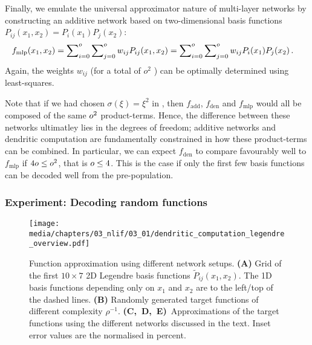 Finally, we emulate the universal approximator nature of multi-layer networks by constructing an additive network based on two-dimensional basis functions $P_{ij}(x_1, x_2) = P_{i}(x_1) P_j(x_2)$:
\begin{align}
	f_\mathrm{mlp}(x_1, x_2)
		&= \sum\nolimits_{i = 0}^{o} \sum\nolimits_{j = 0}^{o} w_{ij} P_{ij}(x_1, x_2) = \sum\nolimits_{i = 0}^{o} \sum\nolimits_{j = 0}^{o} w_{ij} P_{i}(x_1) P_j(x_2) \,.
	\label{eqn:f_mlp}
\end{align}
Again, the weights $w_{ij}$ (for a total of $o^2$ \DOF) can be optimally determined using least-squares.

Note that if we had chosen $\sigma(\xi) = \xi^2$ in , then $f_\mathrm{add}$, $f_\mathrm{den}$ and $f_\mathrm{mlp}$ would all be composed of the same $o^2$ product-terms.
Hence, the difference between these networks ultimatley lies in the degrees of freedom; additive networks and dendritic computation are fundamentally constrained in how these product-terms can be combined.
In particular, we can expect $f_\mathrm{den}$ to compare favourably well to $f_\mathrm{mlp}$ if $4o \leq o^2$, that is $o \leq 4$.
This is the case if only the first few basis functions can be decoded well from the pre-population.

\subsubsection{Experiment: Decoding random functions}

\begin{figure}
	\texttt{[image: media/chapters/03\_nlif/03\_01/dendritic\_computation\_legendre\_overview.pdf]}%
	{\label{fig:dendritic_computation_legendre_overview_a}}%
	{\label{fig:dendritic_computation_legendre_overview_b}}%
	{\label{fig:dendritic_computation_legendre_overview_c}}%
	{\label{fig:dendritic_computation_legendre_overview_d}}%
	{\label{fig:dendritic_computation_legendre_overview_e}}%
	\caption[Function approximation using different network setups]{Function approximation using different network setups.
	\textbf{(A)} Grid of the first $10 \times 7$ 2D Legendre basis functions $\tilde P_{ij}(x_1, x_2)$. The 1D basis functions depending only on $x_1$ and $x_2$ are to the left/top of the dashed lines.
	\textbf{(B)} Randomly generated target functions of different complexity $\rho^{-1}$.
	\textbf{(C,~D,~E)}~Approximations of the target functions using the different networks discussed in the text. Inset error values are the normalised \RMSE in percent.
	}
	\label{fig:dendritic_computation_legendre_overview}
\end{figure}

